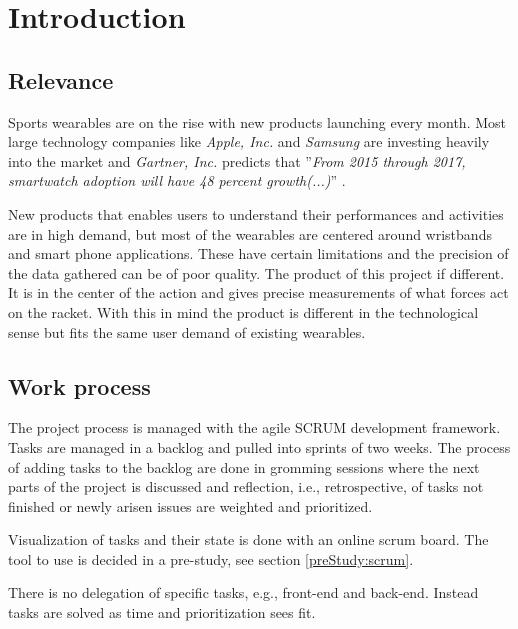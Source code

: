 \chapter{Introduction}

\section*{Relevance}
Sports wearables are on the rise with new products launching every month. 
Most large technology companies like \textit{Apple, Inc.} and \textit{Samsung} are investing heavily into the market and \textit{Gartner, Inc.} predicts that ''\textit{From 2015 through 2017, smartwatch adoption will have 48 percent growth(...)}'' \citep{introduction:relevance:gartner}.

New products that enables users to understand their performances and activities are in high demand, but most of the wearables are centered around wristbands and smart phone applications. 
These have certain limitations and the precision of the data gathered can be of poor quality.
The product of this project if different. 
It is in the center of the action and gives precise measurements of what forces act on the racket.
With this in mind the product is different in the technological sense but fits the same user demand of existing wearables.

\section*{Work process}
The project process is managed with the agile SCRUM development framework. 
Tasks are managed in a backlog and pulled into sprints of two weeks. 
The process of adding tasks to the backlog are done in gromming sessions where the next parts of the project is discussed and reflection, i.e., retrospective, of tasks not finished or newly arisen issues are weighted and prioritized.

Visualization of tasks and their state is done with an online scrum board. 
The tool to use is decided in a pre-study, see section \ref{preStudy:scrum}.

There is no delegation of specific tasks, e.g., front-end and back-end. 
Instead tasks are solved as time and prioritization sees fit.
